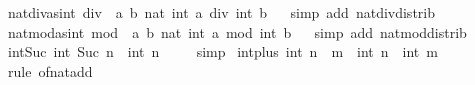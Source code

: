 \begin{isabellebody}
\ nat{\isacharunderscore}{\kern0pt}div{\isacharunderscore}{\kern0pt}as{\isacharunderscore}{\kern0pt}int{\isacharcolon}{\kern0pt}\ {\isachardoublequoteopen}{\isacharparenleft}{\kern0pt}div{\isacharparenright}{\kern0pt}\ {\isacharequal}{\kern0pt}\ {\isacharparenleft}{\kern0pt}{\isasymlambda}a\ b{\isachardot}{\kern0pt}\ nat\ {\isacharparenleft}{\kern0pt}int\ a\ div\ int\ b{\isacharparenright}{\kern0pt}{\isacharparenright}{\kern0pt}{\isachardoublequoteclose}%
\isadelimproof
\ %
\endisadelimproof
%
\isatagproof
{}\isamarkupfalse%
\ {\isacharparenleft}{\kern0pt}simp\ add{\isacharcolon}{\kern0pt}\ nat{\isacharunderscore}{\kern0pt}div{\isacharunderscore}{\kern0pt}distrib{\isacharparenright}{\kern0pt}%
\endisatagproof
{\isafoldproof}%
%
\isadelimproof
%
\endisadelimproof
\isanewline
{}\isamarkupfalse%
\ nat{\isacharunderscore}{\kern0pt}mod{\isacharunderscore}{\kern0pt}as{\isacharunderscore}{\kern0pt}int{\isacharcolon}{\kern0pt}\ {\isachardoublequoteopen}{\isacharparenleft}{\kern0pt}mod{\isacharparenright}{\kern0pt}\ {\isacharequal}{\kern0pt}\ {\isacharparenleft}{\kern0pt}{\isasymlambda}a\ b{\isachardot}{\kern0pt}\ nat\ {\isacharparenleft}{\kern0pt}int\ a\ mod\ int\ b{\isacharparenright}{\kern0pt}{\isacharparenright}{\kern0pt}{\isachardoublequoteclose}%
\isadelimproof
\ %
\endisadelimproof
%
\isatagproof
{}\isamarkupfalse%
\ {\isacharparenleft}{\kern0pt}simp\ add{\isacharcolon}{\kern0pt}\ nat{\isacharunderscore}{\kern0pt}mod{\isacharunderscore}{\kern0pt}distrib{\isacharparenright}{\kern0pt}%
\endisatagproof
{\isafoldproof}%
%
\isadelimproof
%
\endisadelimproof
\isanewline
\isanewline
{}\isamarkupfalse%
\ int{\isacharunderscore}{\kern0pt}Suc{\isacharcolon}{\kern0pt}\ {\isachardoublequoteopen}int\ {\isacharparenleft}{\kern0pt}Suc\ n{\isacharparenright}{\kern0pt}\ {\isacharequal}{\kern0pt}\ int\ n\ {\isacharplus}{\kern0pt}\ {}{\isachardoublequoteclose}%
\isadelimproof
\ %
\endisadelimproof
%
\isatagproof
{}\isamarkupfalse%
\ simp%
\endisatagproof
{\isafoldproof}%
%
\isadelimproof
%
\endisadelimproof
\isanewline
{}\isamarkupfalse%
\ int{\isacharunderscore}{\kern0pt}plus{\isacharcolon}{\kern0pt}\ {\isachardoublequoteopen}int\ {\isacharparenleft}{\kern0pt}n\ {\isacharplus}{\kern0pt}\ m{\isacharparenright}{\kern0pt}\ {\isacharequal}{\kern0pt}\ int\ n\ {\isacharplus}{\kern0pt}\ int\ m{\isachardoublequoteclose}%
\isadelimproof
\ %
\endisadelimproof
%
\isatagproof
{}\isamarkupfalse%
\ {\isacharparenleft}{\kern0pt}rule\ of{\isacharunderscore}{\kern0pt}nat{\isacharunderscore}{\kern0pt}add{\isacharparenright}{\kern0pt}%

\end{isabellebody}
